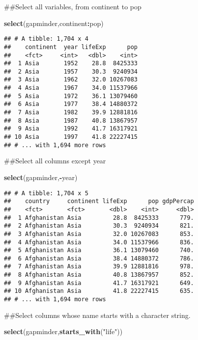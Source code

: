 \documentclass[]{article}
\newenvironment{Shaded}{\begin{snugshade}}{\end{snugshade}}
\newcommand{\KeywordTok}[1]{\textcolor[rgb]{0.13,0.29,0.53}{\textbf{#1}}}
\newcommand{\NormalTok}[1]{#1}
\newcommand{\OperatorTok}[1]{\textcolor[rgb]{0.81,0.36,0.00}{\textbf{#1}}}
\newcommand{\StringTok}[1]{\textcolor[rgb]{0.31,0.60,0.02}{#1}}
\begin{document}
\begin{Shaded}
\begin{Highlighting}[]
\NormalTok{##Select all variables, from continent to pop}

\KeywordTok{select}\NormalTok{(gapminder,continent}\OperatorTok{:}\NormalTok{pop)}
\end{Highlighting}
\end{Shaded}

\begin{verbatim}
## # A tibble: 1,704 x 4
##    continent  year lifeExp      pop
##    <fct>     <int>   <dbl>    <int>
##  1 Asia       1952    28.8  8425333
##  2 Asia       1957    30.3  9240934
##  3 Asia       1962    32.0 10267083
##  4 Asia       1967    34.0 11537966
##  5 Asia       1972    36.1 13079460
##  6 Asia       1977    38.4 14880372
##  7 Asia       1982    39.9 12881816
##  8 Asia       1987    40.8 13867957
##  9 Asia       1992    41.7 16317921
## 10 Asia       1997    41.8 22227415
## # ... with 1,694 more rows
\end{verbatim}

\begin{Shaded}
\begin{Highlighting}[]
\NormalTok{##Select all columns except year}

\KeywordTok{select}\NormalTok{(gapminder,}\OperatorTok{-}\NormalTok{year)}
\end{Highlighting}
\end{Shaded}

\begin{verbatim}
## # A tibble: 1,704 x 5
##    country     continent lifeExp      pop gdpPercap
##    <fct>       <fct>       <dbl>    <int>     <dbl>
##  1 Afghanistan Asia         28.8  8425333      779.
##  2 Afghanistan Asia         30.3  9240934      821.
##  3 Afghanistan Asia         32.0 10267083      853.
##  4 Afghanistan Asia         34.0 11537966      836.
##  5 Afghanistan Asia         36.1 13079460      740.
##  6 Afghanistan Asia         38.4 14880372      786.
##  7 Afghanistan Asia         39.9 12881816      978.
##  8 Afghanistan Asia         40.8 13867957      852.
##  9 Afghanistan Asia         41.7 16317921      649.
## 10 Afghanistan Asia         41.8 22227415      635.
## # ... with 1,694 more rows
\end{verbatim}

\begin{Shaded}
\begin{Highlighting}[]
\NormalTok{##Select columns whose name starts with a character string. }

\KeywordTok{select}\NormalTok{(gapminder,}\KeywordTok{starts_with}\NormalTok{(}\StringTok{"life"}\NormalTok{))}
\end{Highlighting}
\end{Shaded}
\end{document}
